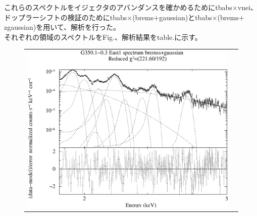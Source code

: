 \documentclass[a4j]{jarticle}%
\begin{document}
これらのスペクトルをイジェクタのアバンダンスを確かめるために\textrm{tbabs$\times$vnei}、ドップラーシフトの検証のために\textrm{tbabs$\times$(brems$+$gaussian)}と\textrm{tbabs$\times$(brems$+$zgaussian)}を用いて、解析を行った。\\
それぞれの領域のスペクトルをFig.{}、解析結果をtable.{}に示す。
\begin{figure}[H]
\begin{center}
\begin{tabular}{cc}

\begin{minipage}{0.5\hsize}
\begin{center}
\includegraphics[scale=0.30]{./ps/East1_bremss+gaussian.eps}
\end{center}
\end{minipage}


\end{tabular}
\end{center}
\end{figure}
\end{document}
